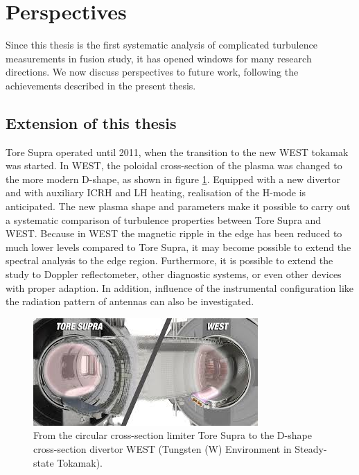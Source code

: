 \section{Perspectives}


Since this thesis is the first systematic analysis of complicated turbulence measurements in fusion study, it has opened windows for many research directions. We now discuss perspectives to future work, following the achievements described in the present thesis.

\subsection*{Extension of this thesis}

Tore Supra operated until 2011, when the transition to the new WEST tokamak was started. In WEST, the poloidal cross-section of the plasma was changed to the more modern D-shape, as shown in figure \ref{fig:ts2west}. Equipped with a new divertor and with auxiliary ICRH and LH heating, realisation of the H-mode is anticipated. The new plasma shape and parameters make it possible to carry out a systematic comparison of turbulence properties between Tore Supra and WEST. Because in WEST the magnetic ripple in the edge has been reduced to much lower levels compared to Tore Supra, it may become possible to extend the spectral analysis to the edge region. Furthermore, it is possible to extend the study to Doppler reflectometer, other diagnostic systems, or even other devices with proper adaption. In addition, influence of the instrumental configuration like the radiation pattern of antennas can also be investigated.



\begin{figure}[h]
\begin{centering}
\includegraphics[scale=0.6]{ts2west.jpg}
\par\end{centering}
\caption{From the circular cross-section limiter Tore Supra to the D-shape cross-section divertor WEST (Tungsten (W) Environment in Steady-state Tokamak).}
\label{fig:ts2west}
\end{figure}


